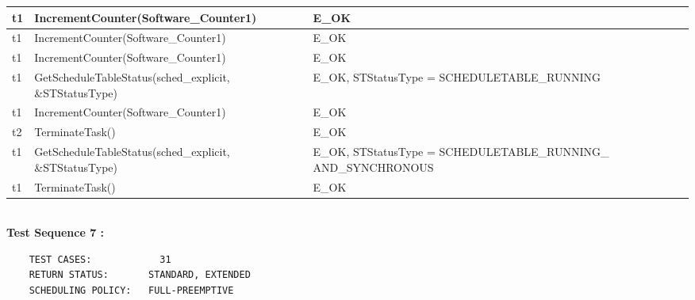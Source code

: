 \documentclass[10pt]{article}
\newlength{\Li}\settowidth{\Li}{Running}
\newlength{\Lii}\setlength{\Lii}{7cm}
\newlength{\Liiii}\setlength{\Liiii}{0.9cm}
\newlength{\Liii}\setlength{\Liii}{\textwidth} \addtolength{\Liii}{-\Li} \addtolength{\Liii}{-\Lii} \addtolength{\Liii}{-\Liiii}
\begin{document}
\begin{supertabular}{|p{\Li}|p{\Lii}|p{\Liii}|p{\Liiii}|}
	t1		& IncrementCounter(Software\_Counter1)						& E\_OK																	& \\ \hline
	t1		& IncrementCounter(Software\_Counter1)						& E\_OK																	& \\ \hline
	t1		& IncrementCounter(Software\_Counter1)						& E\_OK																	& \\ \hline
	t1		& GetScheduleTableStatus(sched\_explicit, \&STStatusType)			& E\_OK, STStatusType = SCHEDULETABLE\_RUNNING 							& \\ \hline
	t1		& IncrementCounter(Software\_Counter1)						& E\_OK																	& \\ \hline
	t2		& TerminateTask()											& E\_OK																	& \\ \hline
	t1		& GetScheduleTableStatus(sched\_explicit, \&STStatusType)			& E\_OK, STStatusType = SCHEDULETABLE\_RUNNING\_ AND\_SYNCHRONOUS		& \\ \hline
	t1		& TerminateTask()											& E\_OK																	& \\ \hline
	\end{supertabular}\\

	\textbf{Test Sequence 7 :}
	\begin{lstlisting}
	TEST CASES:		       31
	RETURN STATUS:	  	 STANDARD, EXTENDED
	SCHEDULING POLICY:   FULL-PREEMPTIVE
	\end{lstlisting}
	
	
\end{document}
